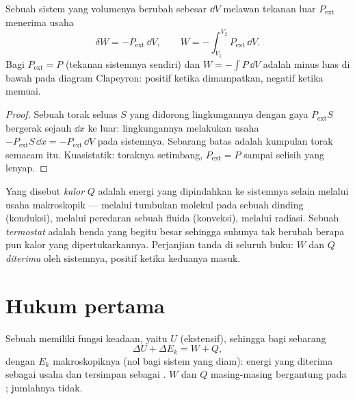 \begin{proposition}\label{prop:b1:first-law:work}
Sebuah sistem yang volumenya berubah sebesar $\dd V$ melawan tekanan luar
$P_{\mathrm{ext}}$ menerima usaha
\[
\delta W = -P_{\mathrm{ext}}\,\dd V, \qquad
W = -\int_{V_1}^{V_2}P_{\mathrm{ext}}\,\dd V .
\]
Bagi  $P_{\mathrm{ext}} = P$ (tekanan sistemnya
sendiri) dan $W = -\int P\,\dd V$ adalah minus luas di bawah  pada
diagram Clapeyron: positif ketika dimampatkan, negatif ketika memuai.
\end{proposition}

\begin{proof}
Sebuah torak seluas $S$ yang didorong lingkungannya dengan gaya
$P_{\mathrm{ext}}S$ bergerak sejauh $\dd x$ ke luar: lingkungannya melakukan usaha
$-P_{\mathrm{ext}}S\,\dd x = -P_{\mathrm{ext}}\,\dd V$ pada sistemnya. Sebarang
batas adalah kumpulan torak semacam itu. Kuasistatik: toraknya
setimbang, $P_{\mathrm{ext}} = P$ sampai selisih yang lenyap.
\end{proof}

\begin{definition}[Kalor]\label{def:b1:first-law:heat}
Yang disebut \emph{kalor} $Q$ adalah energi yang dipindahkan ke sistemnya selain melalui
usaha makroskopik --- melalui tumbukan molekul pada sebuah dinding (konduksi),
melalui peredaran sebuah fluida (konveksi), melalui radiasi. Sebuah
\emph{termostat} adalah benda yang begitu besar sehingga suhunya tak berubah
berapa pun kalor yang dipertukarkannya. Perjanjian tanda di seluruh buku: $W$ dan $Q$
\emph{diterima} oleh sistemnya, positif ketika keduanya masuk.
\end{definition}

\section{Hukum pertama}

\begin{theorem}\label{thm:b1:first-law:firstlaw}
Sebuah  memiliki fungsi keadaan, yaitu \emph{}
$U$ (ekstensif), sehingga bagi sebarang 
\[
\Delta U + \Delta E_{k} = W + Q ,
\]
dengan $E_k$  makroskopiknya (nol bagi sistem yang diam):
energi yang diterima sebagai usaha dan  tersimpan sebagai . $W$
dan $Q$ masing-masing bergantung pada ; jumlahnya tidak.
\end{theorem}
\admitted

